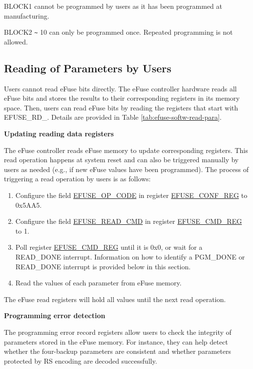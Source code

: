 \documentclass[main\_\_EN.tex]{subfiles}
\begin{document}
BLOCK1 cannot be programmed by users as it has been programmed at manufacturing.

BLOCK2 \verb+~+ 10 can only be programmed once. Repeated programming is not allowed. 

\subsection{Reading of Parameters by Users}
\label{sec:efuse-software-read-para}

Users cannot read eFuse bits directly. The eFuse controller hardware reads all eFuse bits and stores the results to their corresponding registers in its memory space. Then, users can read eFuse bits by reading the registers that start with EFUSE\_RD\_. Details are provided in Table \ref{tab:efuse-softw-read-para}.



{\bfseries Updating reading data registers}
\label{sec:efuse-update-reg}

The eFuse controller reads eFuse memory to update corresponding registers. This read operation happens at system reset and can also be triggered manually by users as needed (e.g., if new eFuse values have been programmed). The process of triggering a read operation by users is as follows:

\begin{enumerate}
    \item Configure the field \hyperref[fielddesc:EFUSEOPCODE]{EFUSE\_OP\_CODE} in register \hyperref[regdesc:EFUSECONFREG]{EFUSE\_CONF\_REG} to 0x5AA5.
    \item Configure the field \hyperref[fielddesc:EFUSEREADCMD]{EFUSE\_READ\_CMD} in register \hyperref[regdesc:EFUSECMDREG]{EFUSE\_CMD\_REG} to 1.
    \item Poll register \hyperref[regdesc:EFUSECMDREG]{EFUSE\_CMD\_REG} until it is 0x0, or wait for a READ\_DONE interrupt. Information on how to identify a PGM\_DONE or READ\_DONE interrupt is provided below in this section.
    \item Read the values of each parameter from eFuse memory.
\end{enumerate}
The eFuse read registers will hold all values until the next read operation.

{\bfseries Programming error detection}

The programming error record registers allow users to check the integrity of parameters stored in the eFuse memory. For instance, they can help detect whether the four-backup parameters are consistent and whether parameters protected by RS encoding are decoded successfully.
\end{document}
